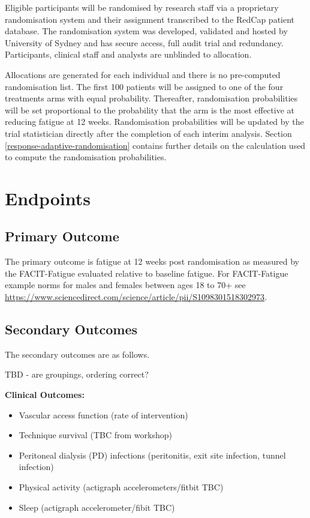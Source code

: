 \documentclass[
]{article}
\begin{document}
Eligible participants will be randomised by research staff via a proprietary randomisation system and their assignment transcribed to the RedCap patient database.
The randomisation system was developed, validated and hosted by University of Sydney and has secure access, full audit trial and redundancy.
Participants, clinical staff and analysts are unblinded to allocation.

Allocations are generated for each individual and there is no pre-computed randomisation list.
The first 100 patients will be assigned to one of the four treatments arms with equal probability.
Thereafter, randomisation probabilities will be set proportional to the probability that the arm is the most effective at reducing fatigue at 12 weeks.
Randomisation probabilities will be updated by the trial statistician directly after the completion of each interim analysis.
Section \ref{response-adaptive-randomisation} contains further details on the calculation used to compute the randomisation probabilities.

\clearpage

\hypertarget{endpoints}{%
\section{Endpoints}\label{endpoints}}

\hypertarget{primary-outcome}{%
\subsection{Primary Outcome}\label{primary-outcome}}

The primary outcome is fatigue at 12 weeks post randomisation as measured by the FACIT-Fatigue evaluated relative to baseline fatigue.
For FACIT-Fatigue example norms for males and females between ages 18 to 70+ see \url{https://www.sciencedirect.com/science/article/pii/S1098301518302973}.

\hypertarget{secondary-outcomes}{%
\subsection{Secondary Outcomes}\label{secondary-outcomes}}

The secondary outcomes are as follows.

TBD - are groupings, ordering correct?

\textbf{Clinical Outcomes:}
\begin{itemize}
    \item Vascular access function (rate of intervention)
    \item Technique survival (TBC from workshop)
    \item Peritoneal dialysis (PD) infections (peritonitis, exit site infection, tunnel infection)
    \item Physical activity (actigraph accelerometers/fitbit TBC)
    \item Sleep (actigraph accelerometer/fibit TBC)
\end{itemize}
\end{document}
